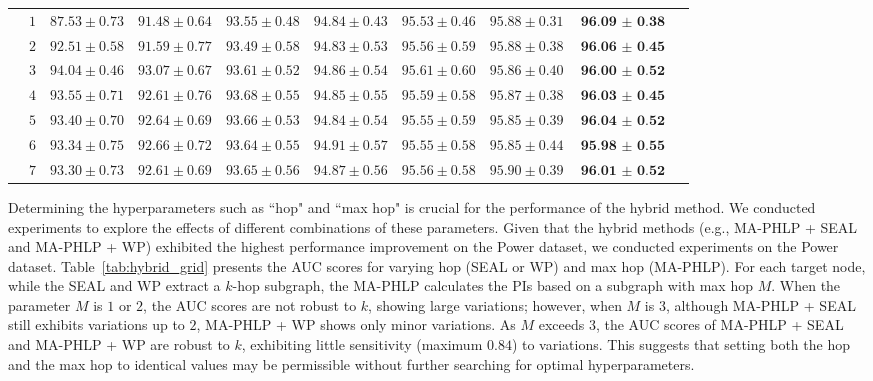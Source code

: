 \begin{table*}[h!]
{\begin{tabular}{c|ccccccccc}
& \multicolumn{1}{c|}{$1$} & $87.53 \pm 0.73$ & $91.48 \pm 0.64$ & \multicolumn{1}{|c}{$93.55 \pm 0.48$} & $94.84 \pm 0.43$ & $95.53 \pm 0.46$ & $95.88 \pm 0.31$ & $\textbf{96.09 $\pm$ 0.38}$ \\
& \multicolumn{1}{c|}{$2$} & $92.51 \pm 0.58$ & $91.59 \pm 0.77$ & \multicolumn{1}{|c}{$93.49 \pm 0.58$} & $94.83 \pm 0.53$ & $95.56 \pm 0.59$ & $95.88 \pm 0.38$ & $\textbf{96.06 $\pm$ 0.45}$ \\
& \multicolumn{1}{c|}{$3$} & $94.04 \pm 0.46$ & $93.07 \pm 0.67$ & \multicolumn{1}{|c}{$93.61 \pm 0.52$} & $94.86 \pm 0.54$ & $95.61 \pm 0.60$ & $95.86 \pm 0.40$ & $\textbf{96.00 $\pm$ 0.52}$ \\
& \multicolumn{1}{c|}{$4$} & $93.55 \pm 0.71$ & $92.61 \pm 0.76$ & \multicolumn{1}{|c}{$93.68 \pm 0.55$} & $94.85 \pm 0.55$ & $95.59 \pm 0.58$ & $95.87 \pm 0.38$ & $\textbf{96.03 $\pm$ 0.45}$ \\
& \multicolumn{1}{c|}{$5$} & $93.40 \pm 0.70$ & $92.64 \pm 0.69$ & \multicolumn{1}{|c}{$93.66 \pm 0.53$} & $94.84 \pm 0.54$ & $95.55 \pm 0.59$ & $95.85 \pm 0.39$ & $\textbf{96.04 $\pm$ 0.52}$ \\
& \multicolumn{1}{c|}{$6$} & $93.34 \pm 0.75$ & $92.66 \pm 0.72$ & \multicolumn{1}{|c}{$93.64 \pm 0.55$} & $94.91 \pm 0.57$ & $95.55 \pm 0.58$ & $95.85 \pm 0.44$ & $\textbf{95.98 $\pm$ 0.55}$ \\
& \multicolumn{1}{c|}{$7$} & $93.30 \pm 0.73$ & $92.61 \pm 0.69$ & \multicolumn{1}{|c}{$93.65 \pm 0.56$} & $94.87 \pm 0.56$ & $95.56 \pm 0.58$ & $95.90 \pm 0.39$ & $\textbf{96.01 $\pm$ 0.52}$ \\
\bottomrule   
\end{tabular}}
\end{table*}

Determining the hyperparameters such as ``hop" and ``max hop" is crucial for the performance of the hybrid method. We conducted experiments to explore the effects of different combinations of these parameters. 
Given that the hybrid methods (e.g., MA-PHLP + SEAL and MA-PHLP + WP) exhibited the highest performance improvement on the Power dataset, 
we conducted experiments on the Power dataset.
Table~\ref{tab:hybrid_grid} presents the AUC scores for varying hop (SEAL or WP) and max hop (MA-PHLP).
For each target node, while the SEAL and WP extract a $k$-hop subgraph, the MA-PHLP calculates the PIs based on a subgraph with max hop $M$.
When the parameter \( M \) is \( 1 \) or \( 2 \), the AUC scores are not robust to \( k \), showing large variations; however, when \( M \) is \( 3 \), although MA-PHLP + SEAL still exhibits variations up to \(2\), MA-PHLP + WP shows only minor variations.
As $M$ exceeds $3$, the AUC scores of MA-PHLP + SEAL and MA-PHLP + WP are robust to $k$, exhibiting little sensitivity (maximum $0.84$) to variations.
This suggests that setting both the hop and the max hop to identical values may be permissible without further searching for optimal hyperparameters.
